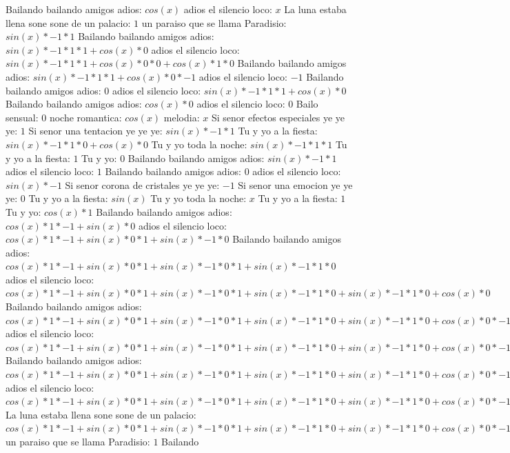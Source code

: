 \documentclass{article}
\begin{document}
\newline Bailando bailando amigos adios: $cos(x)$  \newline adios el silencio loco: $x$ La luna estaba llena sone sone de un palacio: $1$  \newline un paraiso que se llama Paradisio: $sin(x)*-1*1$ Bailando bailando amigos adios: $sin(x)*-1*1*1+cos(x)*0$ adios el silencio loco: ${sin(x)*-1*1*1+cos(x)*0}*0+cos(x)*1*0$ Bailando bailando amigos adios: ${sin(x)*-1*1*1+cos(x)*0}*-1$ adios el silencio loco: $-1$ Bailando bailando amigos adios: $0$  \newline adios el silencio loco: $sin(x)*-1*1*1+cos(x)*0$  \newline Bailando bailando amigos adios: $cos(x)*0$ adios el silencio loco: $0$ Bailo sensual: $0$  \newline noche romantica: $cos(x)$  \newline melodia: $x$ Si senor efectos especiales ye ye ye: $1$  \newline Si senor una tentacion ye ye ye: $sin(x)*-1*1$ Tu y yo a la fiesta: $sin(x)*-1*1*0+cos(x)*0$ Tu y yo toda la noche: $sin(x)*-1*1*1$ Tu y yo a la fiesta: $1$ Tu y yo: $0$  \newline Bailando bailando amigos adios: $sin(x)*-1*1$ adios el silencio loco: $1$ Bailando bailando amigos adios: $0$  \newline adios el silencio loco: $sin(x)*-1$ Si senor corona de cristales ye ye ye: $-1$ Si senor una emocion ye ye ye: $0$  \newline Tu y yo a la fiesta: $sin(x)$  \newline Tu y yo toda la noche: $x$ Tu y yo a la fiesta: $1$  \newline Tu y yo: $cos(x)*1$ Bailando bailando amigos adios: $cos(x)*1*-1+sin(x)*0$ adios el silencio loco: ${cos(x)*1*-1+sin(x)*0}*1+sin(x)*-1*0$ Bailando bailando amigos adios: ${{cos(x)*1*-1+sin(x)*0}*1+sin(x)*-1*0}*1+sin(x)*-1*1*0$ adios el silencio loco: ${{cos(x)*1*-1+sin(x)*0}*1+sin(x)*-1*0}*1+sin(x)*-1*1*0+sin(x)*-1*1*0+cos(x)*0$ Bailando bailando amigos adios: ${{{cos(x)*1*-1+sin(x)*0}*1+sin(x)*-1*0}*1+sin(x)*-1*1*0+sin(x)*-1*1*0+cos(x)*0}*-1+{sin(x)*-1*1*1+cos(x)*0}*0$ adios el silencio loco: ${{{cos(x)*1*-1+sin(x)*0}*1+sin(x)*-1*0}*1+sin(x)*-1*1*0+sin(x)*-1*1*0+cos(x)*0}*-1+{sin(x)*-1*1*1+cos(x)*0}*0+{sin(x)*-1*1*1+cos(x)*0}*0+cos(x)*1*0$ Bailando bailando amigos adios: ${{{cos(x)*1*-1+sin(x)*0}*1+sin(x)*-1*0}*1+sin(x)*-1*1*0+sin(x)*-1*1*0+cos(x)*0}*-1+{sin(x)*-1*1*1+cos(x)*0}*0+{sin(x)*-1*1*1+cos(x)*0}*0+cos(x)*1*0+{sin(x)*-1*1*1+cos(x)*0}*0+cos(x)*1*0+cos(x)*1*0+sin(x)*0$ adios el silencio loco: ${{{{cos(x)*1*-1+sin(x)*0}*1+sin(x)*-1*0}*1+sin(x)*-1*1*0+sin(x)*-1*1*0+cos(x)*0}*-1+{sin(x)*-1*1*1+cos(x)*0}*0+{sin(x)*-1*1*1+cos(x)*0}*0+cos(x)*1*0+{sin(x)*-1*1*1+cos(x)*0}*0+cos(x)*1*0+cos(x)*1*0+sin(x)*0}*0+{{sin(x)*-1*1*1+cos(x)*0}*-1+cos(x)*1*0+cos(x)*1*0+sin(x)*0}*0$ La luna estaba llena sone sone de un palacio: ${{{{cos(x)*1*-1+sin(x)*0}*1+sin(x)*-1*0}*1+sin(x)*-1*1*0+sin(x)*-1*1*0+cos(x)*0}*-1+{sin(x)*-1*1*1+cos(x)*0}*0+{sin(x)*-1*1*1+cos(x)*0}*0+cos(x)*1*0+{sin(x)*-1*1*1+cos(x)*0}*0+cos(x)*1*0+cos(x)*1*0+sin(x)*0}*1$ un paraiso que se llama Paradisio: $1$ Bailando 
\end{document}
